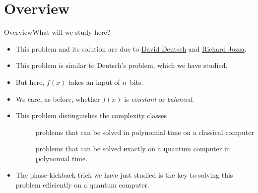 
\section*{Overview}

\begin{frame}{Overview}{What will we study here?}

\begin{itemize}[<+->]
    \item This problem and its solution are due to
    \href{https://en.wikipedia.org/wiki/David_Deutsch}{David Deutsch} and \href{https://en.wikipedia.org/wiki/Richard_Jozsa}{Richard Jozsa}.
    \item This problem is similar to Deutsch's problem, which we have studied.
    \item But here, $f(x)$ takes an input of $n$~bits.
    \item We care, as before, whether $f(x)$ is \emph{constant} or \emph{balanced}.
    \item This problem distinguishes the complexity classes
    \begin{description}
        \item[\href{https://complexityzoo.net/Complexity_Zoo:P}{}] problems that can be solved in polynomial time on a classical computer
        \item[\href{https://complexityzoo.net/Complexity_Zoo:E\#eqp}{}] problems that can be solved \textbf{e}xactly on a \textbf{q}uantum computer in \textbf{p}olynomial time.
    \end{description}
    \item The phase-kickback trick we have just studied is the key to solving this problem efficiently on a quantum computer.
\end{itemize}
    
\end{frame}

